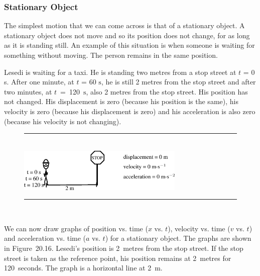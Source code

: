             \subsubsection{ Stationary Object}
            \nopagebreak
        \label{m38795*id69015}The simplest motion that we can come across is that of a stationary object. A stationary object does not move and so its position does not change, for as long as it is standing still.
An example of this situation is when someone is waiting for something without moving.
The person remains in the same position.\par 
        \label{m38795*id69021}Lesedi is waiting for a taxi. He is standing two metres from a stop street at $t$ = 0 s. After one minute, at $t$ = 60 $\mathrm{s}$, he is still 2 metres from the stop street and after two minutes, at $t$~=~120~$\mathrm{s}$, also 2 metres from the stop street. His position has not changed. His displacement is zero (because his position is the same), his velocity is zero (because his displacement is zero) and his acceleration is also zero (because his velocity is not changing).\par 
    \setcounter{subfigure}{0}
	\begin{figure}[H] %
    \begin{center}
    \rule[.1in]{\figurerulewidth}{.005in} \\
        \label{m38795*uid88!!!underscore!!!media}\label{m38795*uid88!!!underscore!!!printimage}\includegraphics[width=300px]{col11305.imgs/m38795_PG10C2_020.png} %
      \vspace{2pt}
    \vspace{.1in}
    \rule[.1in]{\figurerulewidth}{.005in} \\
    \end{center}
 \end{figure}       
        \label{m38795*id69081}We can now draw graphs of position vs. time ($x$ vs. $t$), velocity vs. time ($v$ vs. $t$) and acceleration vs. time ($a$ vs. $t$) for a stationary object. The graphs are shown in Figure~20.16.
Lesedi's position is 2~metres from the stop street. If the stop street is taken as the reference point, his position remains at 2~metres for 120~seconds. The graph is a horizontal line at 2~m.
